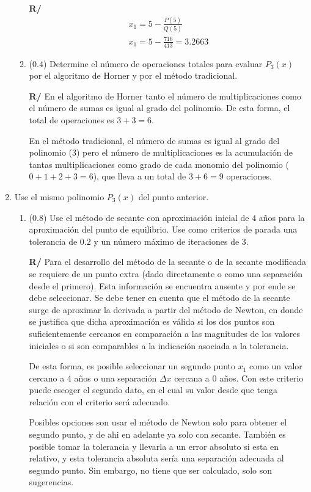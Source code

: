 \documentclass[12pt]{article}
\begin{document}
\begin{enumerate}[leftmargin=*,widest=9]
\begin{enumerate}[label=\alph*]
    \textbf{R/}
    \begin{eqnarray*}
    x_1 = 5 - \frac{P(5)}{Q(5)}\\
    x_1 = 5 - \frac{716}{413} = 3.2663
    \end{eqnarray*}

    \item (\(0.4\)) Determine el número de operaciones totales para evaluar \(P_3(x)\) por el algoritmo de Horner y por el método tradicional.


    \textbf{R/} En el algoritmo de Horner tanto el número de multiplicaciones como el número de sumas es igual al grado del polinomio. De esta forma, el total de operaciones es \(3+3=6\).

    En el método tradicional, el número de sumas es igual al grado del polinomio (\(3\)) pero el número de multiplicaciones es la acumulación de tantas multiplicaciones como grado de cada monomio del polinomio (\(0 + 1 + 2 + 3 = 6 \)), que lleva a un total de \(3+6=9\) operaciones.
    \end{enumerate}


    \item Use el mismo polinomio \(P_3(x)\) del punto anterior.

    \begin{enumerate}[label=\alph*]
    \item (\(0.8\)) Use el método de secante con aproximación inicial de \(4\) años para la aproximación del punto de equilibrio. Use como criterios de parada una tolerancia de \(0.2\) y un número máximo de iteraciones de 3.


    \textbf{R/} Para el desarrollo del método de la secante o de la secante modificada se requiere de un punto extra (dado directamente o como una separación desde el primero). Esta información se encuentra ausente y por ende se debe seleccionar. Se debe tener en cuenta que el método de la secante surge de aproximar la derivada a partir del método de Newton, en donde se justifica que dicha aproximación es válida si los dos puntos son suficientemente cercanos en comparación a las magnitudes de los valores iniciales o si son comparables a la indicación asociada a la tolerancia.

    De esta forma, es posible seleccionar un segundo punto \(x_1\) como un valor cercano a 4 años o una separación \(\Delta x\) cercana a 0 años. Con este criterio puede escoger el segundo dato, en el cual su valor desde que tenga relación con el criterio será adecuado.

    Posibles opciones son usar el método de Newton solo para obtener el segundo punto, y de ahi en adelante ya solo con secante. También es posible tomar la tolerancia y llevarla a un error absoluto si esta en relativo, y esta tolerancia absoluta sería una separación adecuada al segundo punto. Sin embargo, no tiene que ser calculado, solo son sugerencias.


\end{enumerate}
\end{enumerate}
\end{document}
